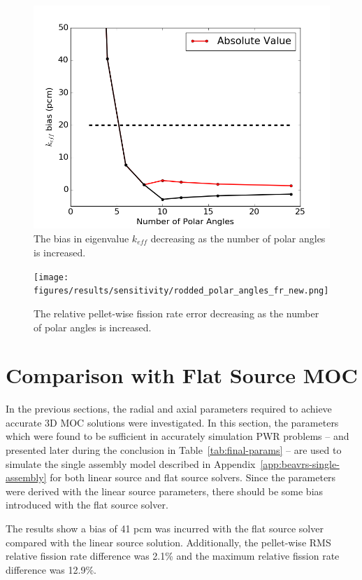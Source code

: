\begin{figure}[h!]
	\centering
	\includegraphics[width=0.7\linewidth]{figures/results/sensitivity/rodded_polar_angles_pcm.png}
	\caption[]{The bias in eigenvalue $k_{\textit{eff}}$ decreasing as the number of polar angles is increased.}
	\label{fig:rodded-polar-angles-pcm}
\end{figure}
\begin{figure}[h!]
	\centering
	\texttt{[image: figures/results/sensitivity/rodded\_polar\_angles\_fr\_new.png]}
	\caption[]{The relative pellet-wise fission rate error decreasing as the number of polar angles is increased.}
	\label{fig:rodded-polar-angles-fr}
\end{figure}

\newpage
\section{Comparison with Flat Source MOC}
\label{sec:flat-linear-comparison}

In the previous sections, the radial and axial parameters required to achieve accurate 3D \ac{MOC} solutions were investigated. In this section, the parameters which were found to be sufficient in accurately simulation \ac{PWR} problems -- and presented later during the conclusion in Table~\ref{tab:final-params} -- are used to simulate the single assembly model described in Appendix~\ref{app:beavrs-single-assembly} for both linear source and flat source solvers. Since the parameters were derived with the linear source parameters, there should be some bias introduced with the flat source solver.

The results show a bias of 41 pcm was incurred with the flat source solver compared with the linear source solution. Additionally, the pellet-wise \ac{RMS} relative fission rate difference was 2.1\% and the maximum relative fission rate difference was 12.9\%. 

